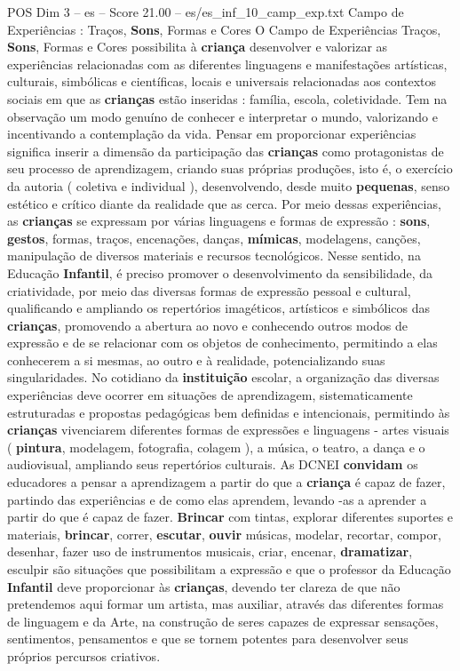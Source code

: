 \begin{textsample}{POS Dim 3 – es – Score 21.00 – es/es\_inf\_10\_camp\_exp.txt}  \label{ex:f3_pos_114}
Campo de Experiências : Traços, \textbf{Sons}, Formas e Cores O Campo de Experiências Traços, \textbf{Sons}, Formas e Cores possibilita à \textbf{criança} desenvolver e valorizar as experiências relacionadas com as diferentes linguagens e manifestações artísticas, culturais, simbólicas e científicas, locais e universais relacionadas aos contextos sociais em que as \textbf{crianças} estão inseridas : família, escola, coletividade.
Tem na observação um modo genuíno de conhecer e interpretar o mundo, valorizando e incentivando a contemplação da vida.
Pensar em proporcionar experiências significa inserir a dimensão da participação das \textbf{crianças} como protagonistas de seu processo de aprendizagem, criando suas próprias produções, isto é, o exercício da autoria ( coletiva e individual ), desenvolvendo, desde muito \textbf{pequenas}, senso estético e crítico diante da realidade que as cerca.
Por meio dessas experiências, as \textbf{crianças} se expressam por várias linguagens e formas de expressão : \textbf{sons}, \textbf{gestos}, formas, traços, encenações, danças, \textbf{mímicas}, modelagens, canções, manipulação de diversos materiais e recursos tecnológicos.
Nesse sentido, na Educação \textbf{Infantil}, é preciso promover o desenvolvimento da sensibilidade, da criatividade, por meio das diversas formas de expressão pessoal e cultural, qualificando e ampliando os repertórios imagéticos, artísticos e simbólicos das \textbf{crianças}, promovendo a abertura ao novo e conhecendo outros modos de expressão e de se relacionar com os objetos de conhecimento, permitindo a elas conhecerem a si mesmas, ao outro e à realidade, potencializando suas singularidades.
No cotidiano da \textbf{instituição} escolar, a organização das diversas experiências deve ocorrer em situações de aprendizagem, sistematicamente estruturadas e propostas pedagógicas bem definidas e intencionais, permitindo às \textbf{crianças} vivenciarem diferentes formas de expressões e linguagens - artes visuais ( \textbf{pintura}, modelagem, fotografia, colagem ), a música, o teatro, a dança e o audiovisual, ampliando seus repertórios culturais.
As DCNEI \textbf{convidam} os educadores a pensar a aprendizagem a partir do que a \textbf{criança} é capaz de fazer, partindo das experiências e de como elas aprendem, levando -as a aprender a partir do que é capaz de fazer. \textbf{Brincar} com tintas, explorar diferentes suportes e materiais, \textbf{brincar}, correr, \textbf{escutar}, \textbf{ouvir} músicas, modelar, recortar, compor, desenhar, fazer uso de instrumentos musicais, criar, encenar, \textbf{dramatizar}, esculpir são situações que possibilitam a expressão e que o professor da Educação \textbf{Infantil} deve proporcionar às \textbf{crianças}, devendo ter clareza de que não pretendemos aqui formar um artista, mas auxiliar, através das diferentes formas de linguagem e da Arte, na construção de seres capazes de expressar sensações, sentimentos, pensamentos e que se tornem potentes para desenvolver seus próprios percursos criativos.

\end{textsample}
